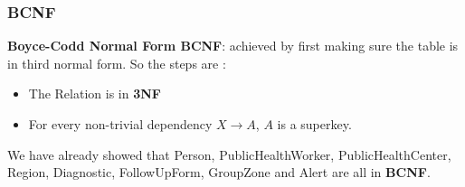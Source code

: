 \subsubsection{BCNF}

\begin{tcolorbox}
    \textbf{Boyce-Codd Normal Form BCNF}: achieved by first making sure the table is in third normal form. So the steps are :
    \begin{itemize}
        \item The Relation is in \textbf{3NF}
        \item For every non-trivial dependency $X\rightarrow A$, $A$ is a superkey.
    \end{itemize}
\end{tcolorbox}

We have already showed that Person, PublicHealthWorker, PublicHealthCenter, Region, Diagnostic, FollowUpForm, GroupZone and Alert are all in \textbf{BCNF}.

